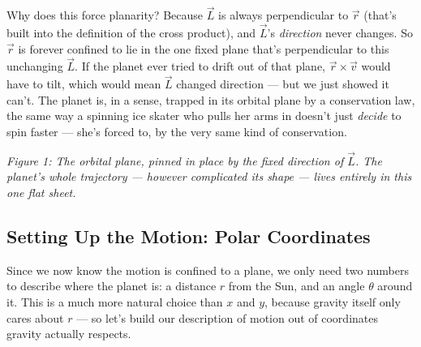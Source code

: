 \documentclass[11pt]{article}
\begin{document}
Why does this force planarity? Because $\vec L$ is always perpendicular to $\vec r$ (that's built
into the definition of the cross product), and $\vec L$'s \emph{direction} never changes. So
$\vec r$ is forever confined to lie in the one fixed plane that's perpendicular to this unchanging
$\vec L$. If the planet ever tried to drift out of that plane, $\vec r\times\vec v$ would have to
tilt, which would mean $\vec L$ changed direction --- but we just showed it can't. The planet is,
in a sense, trapped in its orbital plane by a conservation law, the same way a spinning ice skater
who pulls her arms in doesn't just \emph{decide} to spin faster --- she's forced to, by the very
same kind of conservation.

\begin{center}
\end{center}
\begin{center}\textit{Figure 1: The orbital plane, pinned in place by the fixed direction of
$\vec L$. The planet's whole trajectory --- however complicated its shape --- lives entirely in
this one flat sheet.}\end{center}

\subsection{Setting Up the Motion: Polar Coordinates}

Since we now know the motion is confined to a plane, we only need two numbers to describe where
the planet is: a distance $r$ from the Sun, and an angle $\theta$ around it. This is a much more
natural choice than $x$ and $y$, because gravity itself only cares about $r$ --- so let's build our
description of motion out of coordinates gravity actually respects.
\end{document}
